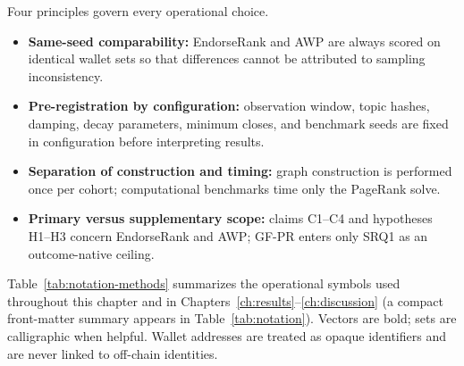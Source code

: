Four principles govern every operational choice.
\begin{itemize}
\item \textbf{Same-seed comparability:} EndorseRank and AWP are always scored on identical wallet sets so that differences cannot be attributed to sampling inconsistency.
\item \textbf{Pre-registration by configuration:} observation window, topic hashes, damping, decay parameters, minimum closes, and benchmark seeds are fixed in configuration before interpreting results.
\item \textbf{Separation of construction and timing:} graph construction is performed once per cohort; computational benchmarks time only the PageRank solve.
\item \textbf{Primary versus supplementary scope:} claims C1--C4 and hypotheses H1--H3 concern EndorseRank and AWP; GF-PR enters only SRQ1 as an outcome-native ceiling.
\end{itemize}


Table~\ref{tab:notation-methods} summarizes the operational symbols used throughout this chapter and in Chapters~\ref{ch:results}--\ref{ch:discussion} (a compact front-matter summary appears in Table~\ref{tab:notation}). Vectors are bold; sets are calligraphic when helpful. Wallet addresses are treated as opaque identifiers and are never linked to off-chain identities.

